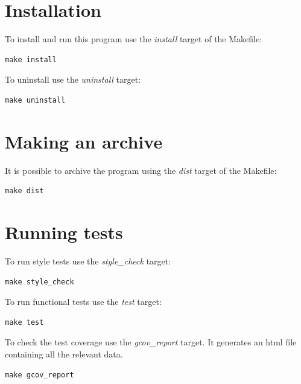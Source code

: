 \documentclass[a4paper, 12pt]{article}
\begin{document}
\begin{abstract}
{\bf \large \parskip 10mm It is also possible to:}
\begin{itemize}
\item \parskip 3mm Save the captured (rendered) images as bmp and jpeg files.
\item Record small screencasts by a special button - the current custom affine transformation of the loaded object into gif-animation (640x480, 10fps, 5s)
\end{itemize}
\end{abstract}

\newpage
\tableofcontents
\newpage

\section{Installation}

To install and run this program use the \textit{install} target of the Makefile:
\begin{verbatim}
make install
\end{verbatim}

To uninstall use the \textit{uninstall} target:
\begin{verbatim}
make uninstall
\end{verbatim}

\section{Making an archive}

It is possible to archive the program using the \textit{dist} target of the Makefile:
\begin{verbatim}
make dist
\end{verbatim}

\section{Running tests}

To run style tests use the \textit{style\_check} target:
\begin{verbatim}
make style_check
\end{verbatim}

To run functional tests use the \textit{test} target:
\begin{verbatim}
make test
\end{verbatim}

To check the test coverage use the \textit{gcov\_report} target. It generates an html file containing all the relevant data.
\begin{verbatim}
make gcov_report
\end{verbatim}
\end{document}
